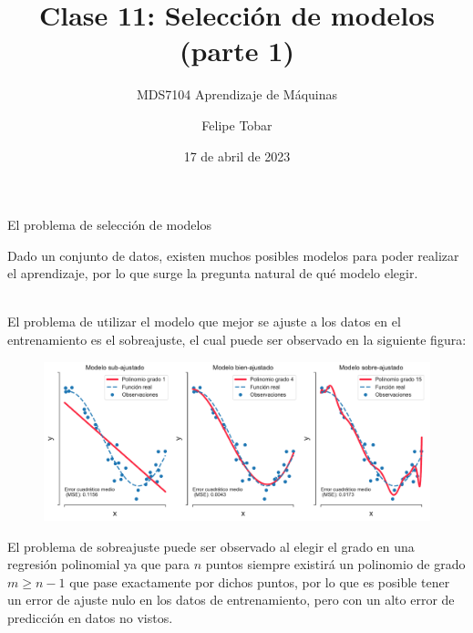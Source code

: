 \documentclass[9pt, handout]{beamer}
\title{Clase 11: Selección de modelos (parte 1)}
\subtitle{MDS7104 Aprendizaje de Máquinas}
\date{17 de abril de 2023}
\author{Felipe Tobar}
\institute{Iniciativa de Datos e Inteligencia Artificial\\Universidad de Chile}
\begin{document}
\begin{frame}
  \titlepage
\end{frame}

\begin{frame}{El problema de selección de modelos}

Dado un conjunto de datos, existen muchos posibles modelos para poder realizar el aprendizaje, por lo que surge la pregunta natural de qué modelo elegir. \\~\ \pause

El problema de utilizar el modelo que mejor se ajuste a los datos en el entrenamiento es el sobreajuste, el cual puede ser observado en la siguiente figura:
\begin{figure}[h!]
    \centering
    \includegraphics[width = 0.8\linewidth]{../../img/cap4_ajuste.pdf}
\end{figure}\pause

El problema de sobreajuste puede ser observado al elegir el grado en una regresión polinomial ya que para $n$ puntos siempre existirá un polinomio de grado $m \geq n -1$ que pase exactamente por dichos puntos, por lo que es posible tener un error de ajuste nulo en los datos de entrenamiento, pero con un alto error de predicción en datos no vistos.

\end{frame}
\end{document}
